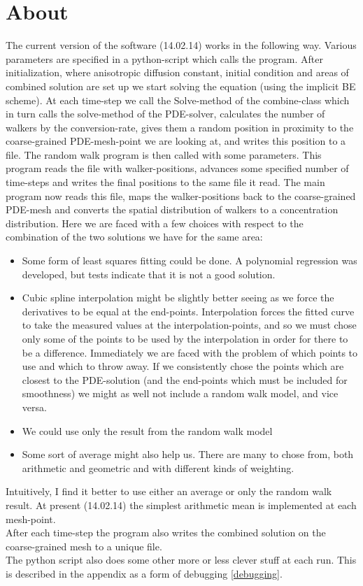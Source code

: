 \section{About}
The current version of the software (14.02.14) works in the following way. 
Various parameters are specified in a python-script which calls the program. 
After initialization, where anisotropic diffusion constant, initial condition and areas of combined solution are set up we start solving the equation (using the implicit BE scheme). 
At each time-step we call the Solve-method of the combine-class which in turn calls the solve-method of the PDE-solver, calculates the number of walkers by the conversion-rate, gives them a random position in proximity to the coarse-grained PDE-mesh-point we are looking at, and writes this position to a file. 
The random walk program is then called with some parameters. This program reads the file with walker-positions, advances some specified number of time-steps and writes the final positions to the same file it read. 
The main program now reads this file, maps the walker-positions back to the coarse-grained PDE-mesh and converts the spatial distribution of walkers to a concentration distribution. 
Here we are faced with a few choices with respect to the combination of the two solutions we have for the same area: 
\begin{itemize}
 \item Some form of least squares fitting could be done. A polynomial regression was developed, but tests indicate that it is not a good solution.
 \item Cubic spline interpolation might be slightly better seeing as we force the derivatives to be equal at the end-points. 
 Interpolation forces the fitted curve to take the measured values at the interpolation-points, and so we must chose only some of the points to be used by the interpolation in order for there to be a difference. Immediately we are faced with the problem of which points to use and which to throw away. If we consistently chose the points which are closest to the PDE-solution (and the end-points which must be included for smoothness) we might as well not include a random walk model, and vice versa.
 \item We could use only the result from the random walk model
 \item Some sort of average might also help us. There are many to chose from, both arithmetic and geometric and with different kinds of weighting.
\end{itemize}
Intuitively, I find it better to use either an average or only the random walk result. At present (14.02.14) the simplest arithmetic mean is implemented at each mesh-point.\\
After each time-step the program also writes the combined solution on the coarse-grained mesh to a unique file.\\
The python script also does some other more or less clever stuff at each run. This is described in the appendix as a form of debugging \ref{debugging}.

